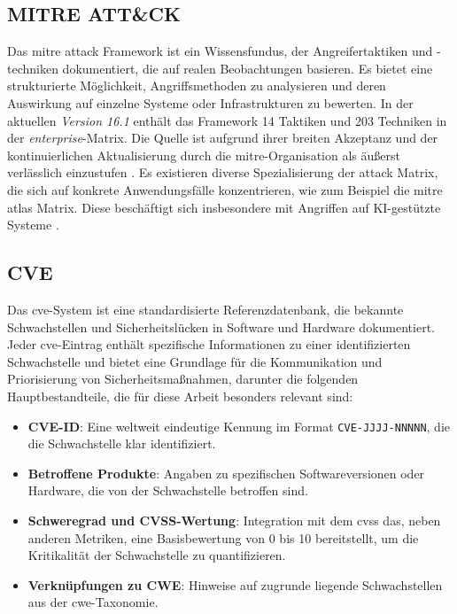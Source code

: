 \subsection{MITRE ATT\&CK}
Das \gls{mitre} \gls{attack} Framework ist ein Wissensfundus, der Angreifertaktiken und -techniken dokumentiert, die auf realen Beobachtungen basieren. Es bietet eine strukturierte Möglichkeit, Angriffsmethoden zu analysieren und deren Auswirkung auf einzelne Systeme oder Infrastrukturen zu bewerten. In der aktuellen \textit{Version 16.1} enthält das Framework 14 Taktiken und 203 Techniken in der \textit{enterprise}-Matrix. Die Quelle ist aufgrund ihrer breiten Akzeptanz und der kontinuierlichen Aktualisierung durch die \gls{mitre}-Organisation als äußerst verlässlich einzustufen \autocite{MITREATTCK}. Es existieren diverse Spezialisierung der \gls{attack} Matrix, die sich auf konkrete Anwendungsfälle konzentrieren, wie zum Beispiel die \gls{mitre} \gls{atlas} Matrix. Diese beschäftigt sich insbesondere mit Angriffen auf KI-gestützte Systeme \autocite{ATLASMatrixMITRE}.

\subsection{CVE}
\label{bg:cve}
Das \gls{cve}-System ist eine standardisierte Referenzdatenbank, die bekannte Schwachstellen und Sicherheitslücken in Software und Hardware dokumentiert. Jeder \gls{cve}-Eintrag enthält spezifische Informationen zu einer identifizierten Schwachstelle und bietet eine Grundlage für die Kommunikation und Priorisierung von Sicherheitsmaßnahmen, darunter die folgenden Hauptbestandteile, die für diese Arbeit besonders relevant sind:

\begin{itemize}
    \item \textbf{CVE-ID}: Eine weltweit eindeutige Kennung im Format \texttt{CVE-JJJJ-NNNNN}, die die Schwachstelle klar identifiziert.
    \item \textbf{Betroffene Produkte}: Angaben zu spezifischen Softwareversionen oder Hardware, die von der Schwachstelle betroffen sind.
    \item \textbf{Schweregrad und CVSS-Wertung}: Integration mit dem \gls{cvss} das, neben anderen Metriken, eine Basisbewertung von 0 bis 10 bereitstellt, um die Kritikalität der Schwachstelle zu quantifizieren.
    \item \textbf{Verknüpfungen zu CWE}: Hinweise auf zugrunde liegende Schwachstellen aus der \gls{cwe}-Taxonomie.
\end{itemize}

